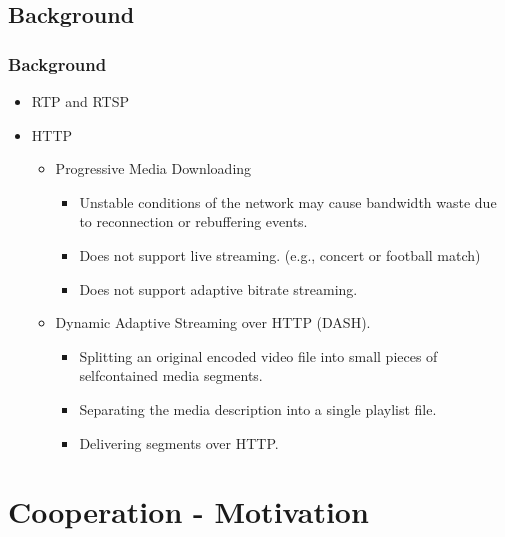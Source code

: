 \documentclass[table]{beamer}
\begin{document}
\subsection{Background}
\begin{frame}
	\frametitle{Background}
	\begin{itemize}
		\item RTP and RTSP	
		\item	HTTP	
		\begin{itemize}
			\item	Progressive Media Downloading	
			\begin{itemize}
\item	Unstable conditions of the network may cause bandwidth waste due to reconnection or rebuffering events.
\item Does not support live streaming. (e.g., concert or football match)
\item Does not support adaptive bitrate streaming.
	\end{itemize}
\item	Dynamic Adaptive  Streaming over HTTP (DASH).	
	\begin{itemize}
\item	Splitting an original encoded video file into small pieces of selfcontained media segments.
\item Separating the media description into a single playlist file.
\item Delivering segments over HTTP.
	\end{itemize}
	\end{itemize}
	\end{itemize}
\end{frame}

\section{Cooperation - Motivation}
\end{document}
